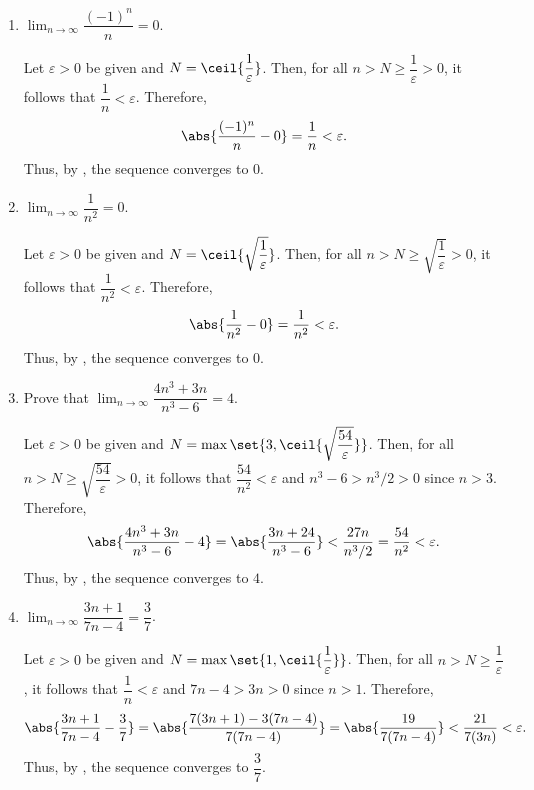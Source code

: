 \begin{enumerate}
\begin{enumerate}
    \newpage

    \item \(\lim_{n\to\infty}\dfrac{(-1)^n}{n}=0\).
    \begin{subprove}
      Let \(\varepsilon>0\) be given and 
      $N=\ceil{\dfrac{1}{\varepsilon}}$.
      Then, for all \(n > N \ge \dfrac{1}{\varepsilon} > 0\), 
      it follows that \(\dfrac{1}{n} < \varepsilon\).
      Therefore,
      \[
        \abs{\dfrac{(-1)^n}{n}-0}=\dfrac{1}{n}<\varepsilon.
      \]
      Thus, by , the sequence converges to \(0\).
    \end{subprove}

    \item \(\lim_{n\to\infty}\dfrac{1}{n^2}=0\).
    \begin{subprove}
      Let \(\varepsilon>0\) be given and 
      \(N=\ceil{\sqrt{\dfrac{1}{\varepsilon}}}\). 
      Then, for all \(n > N \ge \sqrt{\dfrac{1}{\varepsilon}} > 0\), 
      it follows that \(\dfrac{1}{n^2} < \varepsilon\).
      Therefore,
      \[
        \abs{\dfrac{1}{n^2}-0}=\dfrac{1}{n^2}<\varepsilon.
      \]
      Thus, by , the sequence converges to \(0\).
    \end{subprove}


    \item Prove that \(\lim_{n\to\infty}\dfrac{4n^3+3n}{n^3-6}=4\).
    \begin{subprove}
      Let \(\varepsilon>0\) be given and 
      \(N=\max\set{3, \ceil{\sqrt{\dfrac{54}{\varepsilon}}}}\).
      Then, for all \(n > N \ge \sqrt{\dfrac{54}{\varepsilon}} > 0\), 
      it follows that \(\dfrac{54}{n^2} < \varepsilon\) and 
      \(n^3-6 > n^3/2 > 0\) since \(n > 3\).
      Therefore,
      \[
        \abs{\dfrac{4n^3+3n}{n^3-6}-4}
        =\abs{\dfrac{3n+24}{n^3-6}}
        <\dfrac{27n}{n^3/2}=\dfrac{54}{n^2}
        <\varepsilon.
      \]
      Thus, by , the sequence converges to \(4\).
    \end{subprove}


    \item \(\lim_{n\to\infty}\dfrac{3n+1}{7n-4}=\dfrac{3}{7}\).
    \begin{subprove}
      Let \(\varepsilon>0\) be given and 
      \(N=\max\set{1, \ceil{\dfrac{1}{\varepsilon}}}\).
      Then, for all \(n > N \ge \dfrac{1}{\varepsilon}\), 
      it follows that \(\dfrac{1}{n} < \varepsilon\) and
      \(7n-4 > 3n > 0\) since \(n > 1\).
      Therefore,
      \[
        \abs{\dfrac{3n+1}{7n-4} - \dfrac{3}{7}}
        =\abs{\dfrac{7(3n+1) - 3(7n-4)}{7(7n-4)}}
        =\abs{\dfrac{19}{7(7n-4)}}
        <\dfrac{21}{7(3n)}
        <\varepsilon.
      \]
      Thus, by , the sequence converges to \(\dfrac{3}{7}\).
    \end{subprove}



\end{enumerate}
\end{enumerate}
